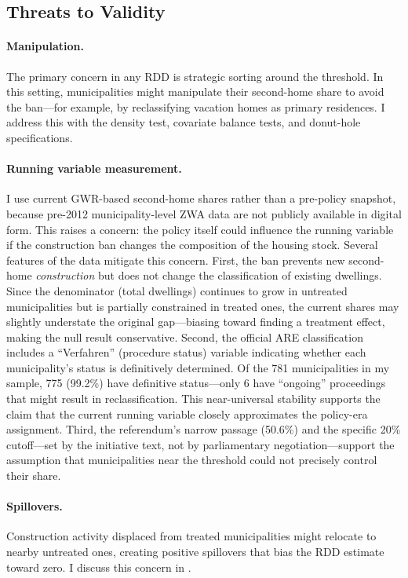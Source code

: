 \documentclass[12pt]{article}
\begin{document}
\subsection{Threats to Validity}\label{sec:threats}

\paragraph{Manipulation.} The primary concern in any RDD is strategic sorting around the threshold. In this setting, municipalities might manipulate their second-home share to avoid the ban---for example, by reclassifying vacation homes as primary residences. I address this with the \citet{cattaneo2020} density test, covariate balance tests, and donut-hole specifications.

\paragraph{Running variable measurement.} I use current GWR-based second-home shares rather than a pre-policy snapshot, because pre-2012 municipality-level ZWA data are not publicly available in digital form. This raises a concern: the policy itself could influence the running variable if the construction ban changes the composition of the housing stock. Several features of the data mitigate this concern. First, the ban prevents new second-home \textit{construction} but does not change the classification of existing dwellings. Since the denominator (total dwellings) continues to grow in untreated municipalities but is partially constrained in treated ones, the current shares may slightly understate the original gap---biasing toward finding a treatment effect, making the null result conservative. Second, the official ARE classification includes a ``Verfahren'' (procedure status) variable indicating whether each municipality's status is definitively determined. Of the 781 municipalities in my sample, 775 (99.2\%) have definitive status---only 6 have ``ongoing'' proceedings that might result in reclassification. This near-universal stability supports the claim that the current running variable closely approximates the policy-era assignment. Third, the referendum's narrow passage (50.6\%) and the specific 20\% cutoff---set by the initiative text, not by parliamentary negotiation---support the assumption that municipalities near the threshold could not precisely control their share.

\paragraph{Spillovers.} Construction activity displaced from treated municipalities might relocate to nearby untreated ones, creating positive spillovers that bias the RDD estimate toward zero. I discuss this concern in .
\end{document}
